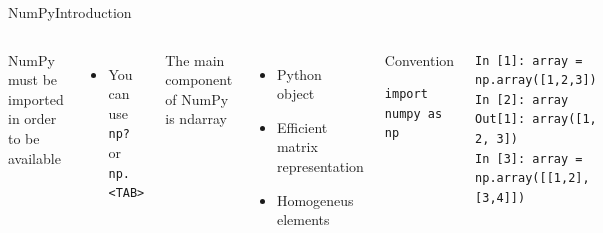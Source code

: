\documentclass[10pt,compress]{beamer} %
\begin{document}
\begin{frame}[fragile]{NumPy}{Introduction}
	\begin{columns}
		NumPy must be imported in order to be available
		\begin{itemize}
			\item You can use \texttt{np?} or \texttt{np.<TAB>}
		\end{itemize}

		The main component of NumPy is \alert{ndarray}
		\begin{itemize}
			\item Python object
			\item Efficient matrix representation
			\item Homogeneus elements
		\end{itemize}

		\begin{block}{\footnotesize{Convention}}
		\vspace{-0.2cm} 
\begin{lstlisting}
import numpy as np
\end{lstlisting}
		\vspace{-0.2cm} 
		\end{block}

		\begin{exampleblock}{}
		\vspace{-0.2cm} 
\begin{lstlisting}
In [1]: array = np.array([1,2,3])
In [2]: array
Out[1]: array([1, 2, 3])
In [3]: array = np.array([[1,2],[3,4]])
\end{lstlisting}
		\vspace{-0.2cm} 
		\end{exampleblock}
	\end{columns}
\end{frame}
\end{document}
